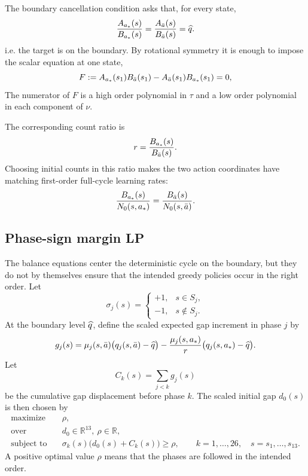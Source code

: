 The boundary cancellation condition asks that, for every state,
\begin{equation}
    {A_{a_*}(s)\over B_{a_*}(s)}=
    {A_{\bar a}(s)\over B_{\bar a}(s)}=
    \widehat q.
\label{eq:abstract-balance}
\end{equation}
i.e. the target is on the boundary. By rotational symmetry it is enough to impose the scalar equation at one state,
\begin{equation}
    F:=A_{a_*}(s_1)B_{\bar a}(s_1)-A_{\bar a}(s_1)B_{a_*}(s_1)=0,
\label{eq:abstract-F}
\end{equation}
The numerator of $F$ is a high order polynomial in $\tau$ and a low
order polynomial in each component of $\nu$.

The corresponding count ratio is
\begin{equation}
    r={B_{a_*}(s)\over B_{\bar a}(s)}.
\label{eq:abstract-ratio}
\end{equation}
Choosing initial counts in this ratio makes the two action coordinates have matching first-order full-cycle learning rates:
\begin{equation*}
    {B_{a_*}(s)\over N_0(s,a_*)}=
    {B_{\bar a}(s)\over N_0(s,\bar a)}.
\end{equation*}

\subsection{Phase-sign margin LP}
\label{sec:sign-margin-lp}

The balance equations center the deterministic cycle on the boundary, but they do not by themselves ensure that the intended greedy policies occur in the right order.  Let
\begin{equation*}
    \sigma_j(s)=
    \begin{cases}
    +1, & s\in S_j,\\
    -1, & s\notin S_j.
    \end{cases}
\end{equation*}
At the boundary level $\widehat q$, define the scaled expected gap increment in phase $j$ by
\begin{equation}
    g_j(s)=
    \mu_j(s,\bar a)\bigl(q_j(s,\bar a)-\widehat q\bigr)
    -{\mu_j(s,a_*)\over r}\bigl(q_j(s,a_*)-\widehat q\bigr).
\label{eq:gap-increment}
\end{equation}
Let
\begin{equation*}
    C_k(s)=\sum_{j<k}g_j(s)
\end{equation*}
be the cumulative gap displacement before phase $k$.  The scaled
initial gap $d_0(s)$ is then chosen by
\begin{equation}
\begin{aligned}
\text{maximize}\quad & \rho,\\
\text{over}\quad & d_0\in\mathbb R^{13},\ \rho\in\mathbb R,\\
\text{subject to}\quad
&\sigma_k(s)\bigl(d_0(s)+C_k(s)\bigr)\ge \rho,
\qquad k=1,\ldots,26,
\quad s=s_1,\ldots,s_{13}.
\end{aligned}
\label{eq:sign-lp}
\end{equation}
A positive optimal value $\rho$ means that the phases are followed in
the intended order.

